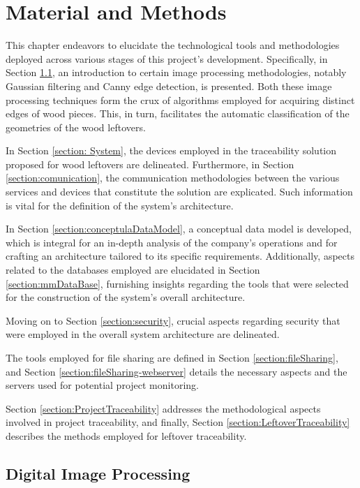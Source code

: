 \chapter{Material and Methods}\label{cap:studyOfTools}

This chapter endeavors to elucidate the technological tools and methodologies deployed across various stages of this project’s development. Specifically, in Section \ref{section:imageProcessing}, an introduction to certain image processing methodologies, notably Gaussian filtering and Canny edge detection, is presented. Both these image processing techniques form the crux of algorithms employed for acquiring distinct edges of wood pieces. This, in turn, facilitates the automatic classification of the geometries of the wood leftovers.

In Section \ref{section: System}, the devices employed in the traceability solution proposed for wood leftovers are delineated. Furthermore, in Section \ref{section:comunication}, the communication methodologies between the various services and devices that constitute the solution are explicated. Such information is vital for the definition of the system's architecture.
 
 
In Section \ref{section:conceptulaDataModel}, a conceptual data model is developed, which is integral for an in-depth analysis of the company's operations and for crafting an architecture tailored to its specific requirements. Additionally, aspects related to the databases employed are elucidated in Section \ref{section:mmDataBase}, furnishing insights regarding the tools that were selected for the construction of the system's overall architecture.

Moving on to Section \ref{section:security}, crucial aspects regarding security that were employed in the overall system architecture are delineated.

The tools employed for file sharing are defined in Section \ref{section:fileSharing}, and Section \ref{section:fileSharing-webserver} details the necessary aspects and the servers used for potential project monitoring.

Section \ref{section:ProjectTraceability} addresses the methodological aspects involved in project traceability, and finally, Section \ref{section:LeftoverTraceability} describes the methods employed for leftover traceability.

\section{Digital Image Processing}\label{section:imageProcessing}

